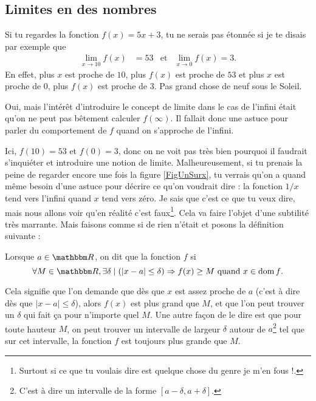 \subsection{Limites en des nombres}

Si tu regardes la fonction $f(x)=5x+3$, tu ne serais pas étonnée si je te disais par exemple que 
\begin{align}
\lim_{x\to 10}f(x)&=53&\text{et}&\lim_{x\to 0}f(x)=3.
\end{align}
En effet, plus $x$ est proche de $10$, plus $f(x)$ est proche de $53$ et plus $x$ est proche de $0$, plus $f(x)$ est proche de $3$. Pas grand chose de neuf sous le Soleil.

 Oui, mais l'intérêt d'introduire le concept de limite dans le cas de l'infini était qu'on ne peut pas bêtement calculer $f(\infty)$. Il fallait donc une astuce pour parler du comportement de $f$ quand on s'approche de l'infini.

Ici, $f(10)=53$ et $f(0)=3$, donc on ne voit pas très bien pourquoi il faudrait s'inquiéter et introduire une notion de limite. Malheureusement, si tu prenais la peine de regarder encore une fois la figure \ref{FigUnSurx}, tu verrais qu'on a quand même besoin d'une astuce pour décrire ce qu'on voudrait dire  : la fonction $1/x$ tend vers l'infini quand $x$ tend vers zéro. Je sais que c'est ce que tu veux dire, mais nous allons voir qu'en réalité c'est faux\footnote{Surtout si ce que tu voulais dire est quelque chose du genre \og je m'en fous !\fg.}. Cela va faire l'objet d'une subtilité très marrante. Mais faisons comme si de rien n'était et posons la définition suivante :
\begin{definition}		\label{DefInfNombre}
Lorsque $a\in\eR$, on dit que la fonction $f$  si
\[ 
  \forall M\in\eR,\exists \delta\tq (| x-a |\leq \delta )\Rightarrow f(x)\geq M\text{ quand $x\in\dom f$}.
\]
\end{definition}
Cela signifie que l'on demande que dès que $x$ est assez proche de $a$ (c'est à dire dès que $| x-a |\leq\delta$), alors $f(x)$ est plus grand que $M$, et que l'on peut trouver un $\delta$ qui fait ça pour n'importe quel $M$. Une autre façon de le dire est que pour toute hauteur $M$, on peut trouver un intervalle de largeur $\delta$ autour de $a$\footnote{C'est à dire un intervalle de la forme $[a-\delta,a+\delta]$.} tel que sur cet intervalle, la fonction $f$ est toujours plus grande que $M$.

